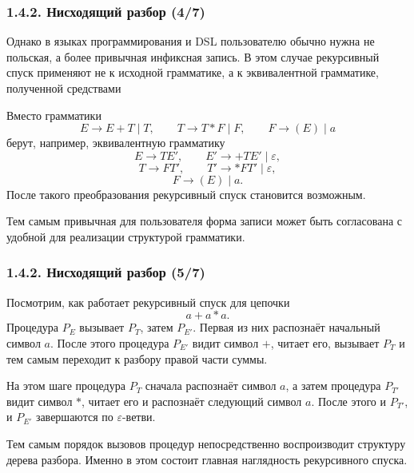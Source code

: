 \begin{frame}
\frametitle{1.4.2. Нисходящий разбор (4/7)}

Однако в языках программирования и DSL пользователю обычно нужна не польская,
а более привычная инфиксная запись. В этом случае рекурсивный спуск применяют
не к исходной грамматике, а к эквивалентной грамматике, полученной средствами

\begin{example}
Вместо грамматики
\[
E \to E + T \mid T,\qquad
T \to T * F \mid F,\qquad
F \to (E) \mid a
\]
берут, например, эквивалентную грамматику
\[
E \to T E',\qquad
E' \to + T E' \mid \varepsilon,
\]
\[
T \to F T',\qquad
T' \to * F T' \mid \varepsilon,
\]
\[
F \to (E) \mid a.
\]
После такого преобразования рекурсивный спуск становится возможным.
\end{example}

Тем самым привычная для пользователя форма записи может быть согласована с удобной
для реализации структурой грамматики.

\end{frame}

\begin{frame}
\frametitle{1.4.2. Нисходящий разбор (5/7)}

Посмотрим, как работает рекурсивный спуск для цепочки
\[
a+a*a.
\]
Процедура $P_E$ вызывает $P_T$, затем $P_{E'}$. Первая из них распознаёт начальный
символ $a$. После этого процедура $P_{E'}$ видит символ $+$, читает его, вызывает
$P_T$ и тем самым переходит к разбору правой части суммы.

На этом шаге процедура $P_T$ сначала распознаёт символ $a$, а затем процедура
$P_{T'}$ видит символ $*$, читает его и распознаёт следующий символ $a$.
После этого и $P_{T'}$, и $P_{E'}$ завершаются по $\varepsilon$-ветви.

\begin{remark}
Тем самым порядок вызовов процедур непосредственно воспроизводит структуру дерева
разбора. Именно в этом состоит главная наглядность рекурсивного спуска.
\end{remark}

\end{frame}

